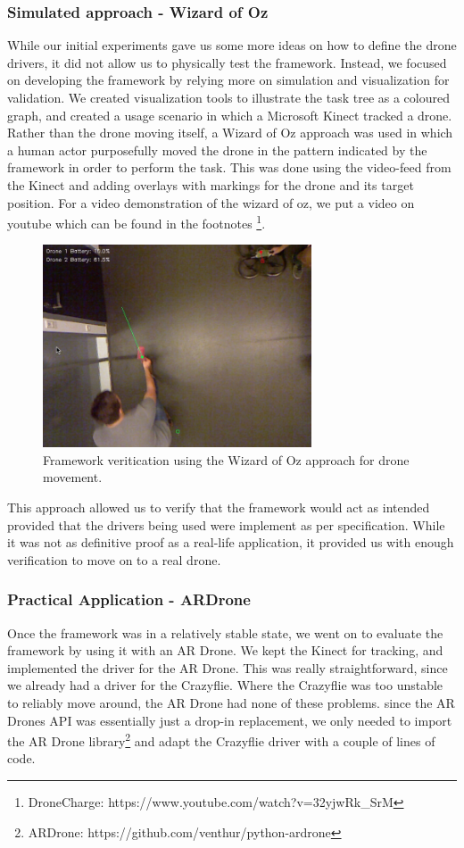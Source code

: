 \subsubsection{Simulated approach - Wizard of Oz}
While our initial experiments gave us some more ideas on how to define the drone drivers, it did not allow us to physically test the framework. Instead, we focused on developing the framework by relying more on simulation and visualization for validation. We created visualization tools to illustrate the task tree as a coloured graph, and created a usage scenario in which a Microsoft Kinect tracked a drone. Rather than the drone moving itself, a Wizard of Oz approach was used in which a human actor purposefully moved the drone in the pattern indicated by the framework in order to perform the task. This was done using the video-feed from the Kinect and adding overlays with markings for the drone and its target position. For a video demonstration of the wizard of oz, we put a video on youtube which can be found in the footnotes \footnote{DroneCharge: https://www.youtube.com/watch?v=32yjwRk\_SrM}.

\begin{figure}[h]
\begin{center}
\includegraphics[height=6cm]{images/wizardofoz.png}
\caption{Framework veritication using the Wizard of Oz approach for drone movement.}
\label{fig:wizardofoz}
\end{center}
\end{figure}

This approach allowed us to verify that the framework would act as intended provided that the drivers being used were implement as per specification.  While it was not as definitive proof as a real-life application, it provided us with enough verification to move on to a real drone.

\subsubsection{Practical Application - ARDrone}
Once the framework was in a relatively stable state, we went on to evaluate the framework by using it with an AR Drone. We kept the Kinect for tracking, and implemented the driver for the AR Drone. This was really straightforward, since we already had a driver for the Crazyflie. Where the Crazyflie was too unstable to reliably move around, the AR Drone had none of these problems. since the AR Drones API was essentially just a drop-in replacement, we only needed to import the AR Drone library\footnote{ARDrone: https://github.com/venthur/python-ardrone} and adapt the Crazyflie driver with a couple of lines of code.

